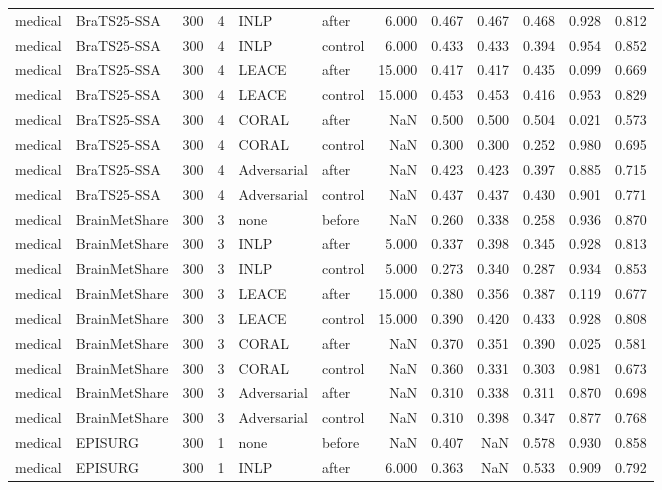 \begin{tabular}{llrrllrrrrrr}
medical & BraTS25-SSA & 300 & 4 & INLP & after & 6.000 & 0.467 & 0.467 & 0.468 & 0.928 & 0.812 \\
medical & BraTS25-SSA & 300 & 4 & INLP & control & 6.000 & 0.433 & 0.433 & 0.394 & 0.954 & 0.852 \\
medical & BraTS25-SSA & 300 & 4 & LEACE & after & 15.000 & 0.417 & 0.417 & 0.435 & 0.099 & 0.669 \\
medical & BraTS25-SSA & 300 & 4 & LEACE & control & 15.000 & 0.453 & 0.453 & 0.416 & 0.953 & 0.829 \\
medical & BraTS25-SSA & 300 & 4 & CORAL & after & NaN & 0.500 & 0.500 & 0.504 & 0.021 & 0.573 \\
medical & BraTS25-SSA & 300 & 4 & CORAL & control & NaN & 0.300 & 0.300 & 0.252 & 0.980 & 0.695 \\
medical & BraTS25-SSA & 300 & 4 & Adversarial & after & NaN & 0.423 & 0.423 & 0.397 & 0.885 & 0.715 \\
medical & BraTS25-SSA & 300 & 4 & Adversarial & control & NaN & 0.437 & 0.437 & 0.430 & 0.901 & 0.771 \\
medical & BrainMetShare & 300 & 3 & none & before & NaN & 0.260 & 0.338 & 0.258 & 0.936 & 0.870 \\
medical & BrainMetShare & 300 & 3 & INLP & after & 5.000 & 0.337 & 0.398 & 0.345 & 0.928 & 0.813 \\
medical & BrainMetShare & 300 & 3 & INLP & control & 5.000 & 0.273 & 0.340 & 0.287 & 0.934 & 0.853 \\
medical & BrainMetShare & 300 & 3 & LEACE & after & 15.000 & 0.380 & 0.356 & 0.387 & 0.119 & 0.677 \\
medical & BrainMetShare & 300 & 3 & LEACE & control & 15.000 & 0.390 & 0.420 & 0.433 & 0.928 & 0.808 \\
medical & BrainMetShare & 300 & 3 & CORAL & after & NaN & 0.370 & 0.351 & 0.390 & 0.025 & 0.581 \\
medical & BrainMetShare & 300 & 3 & CORAL & control & NaN & 0.360 & 0.331 & 0.303 & 0.981 & 0.673 \\
medical & BrainMetShare & 300 & 3 & Adversarial & after & NaN & 0.310 & 0.338 & 0.311 & 0.870 & 0.698 \\
medical & BrainMetShare & 300 & 3 & Adversarial & control & NaN & 0.310 & 0.398 & 0.347 & 0.877 & 0.768 \\
medical & EPISURG & 300 & 1 & none & before & NaN & 0.407 & NaN & 0.578 & 0.930 & 0.858 \\
medical & EPISURG & 300 & 1 & INLP & after & 6.000 & 0.363 & NaN & 0.533 & 0.909 & 0.792 \\

\end{tabular}
